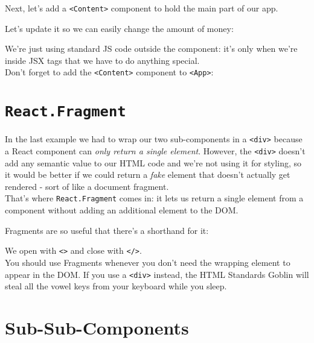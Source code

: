 Next, let's add a \texttt{<Content>} component to hold the main part of our app.


Let's update it so we can easily change the amount of money:


We're just using standard JS code outside the component: it's only when we're inside JSX tags that we have to do anything special.
\\

Don't forget to add the \texttt{<Content>} component to \texttt{<App>}:



\section{\texttt{React.Fragment}}

In the last example we had to wrap our two sub-components in a \texttt{<div>} because a React component can \textit{only return a single element}. However, the \texttt{<div>} doesn't add any semantic value to our HTML code and we're not using it for styling, so it would be better if we could return a \textit{fake} element that doesn't actually get rendered - sort of like a document fragment.
\\

That's where \texttt{React.Fragment} comes in: it lets us return a single element from a component without adding an additional element to the DOM.


Fragments are so useful that there's a shorthand for it:


We open with \texttt{<>} and close with \texttt{</>}.
\\

You should use Fragments whenever you don't need the wrapping element to appear in the DOM. If you use a \texttt{<div>} instead, the HTML Standards Goblin will steal all the vowel keys from your keyboard while you sleep.




\section{Sub-Sub-Components}

